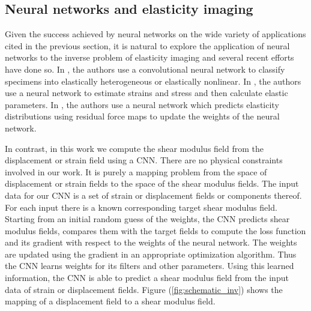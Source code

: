 \documentclass[12pt]{article}
\begin{document}
\subsection{Neural networks and elasticity imaging}
Given the success achieved by neural networks on the wide variety of applications cited in the previous section, it is natural to explore the application of neural networks to the inverse problem of elasticity imaging and several recent efforts \cite{paper:pateloberai2019,misc:gu2020,paper:hoeriginsana2016} have done so. In \cite{paper:pateloberai2019}, the authors use a convolutional neural network to classify specimens into elastically heterogeneous or elastically nonlinear. In \cite{paper:hoeriginsana2016}, the authors use a neural network to estimate strains and stress and then calculate elastic parameters. In \cite{misc:gu2020}, the authors use a neural network which predicts elasticity distributions using residual force maps to update the weights of the neural network.

In contrast, in this work we compute the shear modulus field from the displacement or strain field using a CNN. There are no physical constraints involved in our work. It is purely a mapping problem from the space of displacement or strain fields to the space of the shear modulus fields. The input data for our CNN is a set of strain or displacement fields or components thereof. For each input there is a known corresponding target shear modulus field. Starting from an initial random guess of the weights, the CNN predicts shear modulus fields, compares them with the target fields to compute the loss function and its gradient with respect to the weights of the neural network. The weights are updated using the gradient in an appropriate optimization algorithm. Thus the CNN learns weights for its filters and other parameters. Using this learned information, the CNN is able to predict a shear modulus field from the input data of strain or displacement fields. Figure (\ref{fig:schematic_inv}) shows the mapping of a displacement field to a shear modulus field.\\
\end{document}
